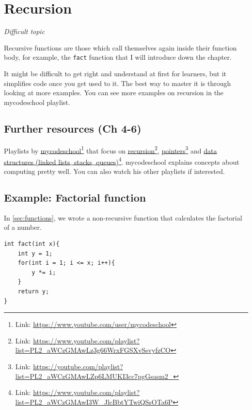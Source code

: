 \chapter{Recursion}

\textit{Difficult topic}


Recursive functions are those which call themselves again inside their function body, for example, the \texttt{fact} function that I will introduce down the chapter.

It might be difficult to get right and understand at first for learners, but it simplifies code once you get used to it. The best way to master it is through looking at more examples. You can see more examples on recursion in the mycodeschool playlist.

\section{Further resources (Ch 4-6)}

Playlists by 
\href{https://www.youtube.com/user/mycodeschool}{mycodeschool}\footnote{Link: \href{https://www.youtube.com/user/mycodeschool}{https://www.youtube.com/user/mycodeschool}}
that focus on 
\href{https://www.youtube.com/playlist?list=PL2\_aWCzGMAwLz3g66WrxFGSXvSsvyfzCO}{recursion}\footnote{Link: \href{https://www.youtube.com/playlist?list=PL2\_aWCzGMAwLz3g66WrxFGSXvSsvyfzCO}{https://www.youtube.com/playlist?list=PL2\_aWCzGMAwLz3g66WrxFGSXvSsvyfzCO}}, 
\href{https://youtube.com/playlist?list=PL2_aWCzGMAwLZp6LMUKI3cc7pgGsasm2_}{pointers}\footnote{Link: \href{https://youtube.com/playlist?list=PL2_aWCzGMAwLZp6LMUKI3cc7pgGsasm2_}{https://youtube.com/playlist?list=PL2\_aWCzGMAwLZp6LMUKI3cc7pgGsasm2\_}} and 
\href{https://www.youtube.com/playlist?list=PL2_aWCzGMAwI3W_JlcBbtYTwiQSsOTa6P}{data structures (linked lists, stacks, queues)}\footnote{Link: \href{https://www.youtube.com/playlist?list=PL2_aWCzGMAwI3W_JlcBbtYTwiQSsOTa6P}{https://www.youtube.com/playlist?list=PL2\_aWCzGMAwI3W\_JlcBbtYTwiQSsOTa6P}}.
mycodeschool explains concepts about computing pretty well. You can also watch his other playlists if interested.

\section{Example: Factorial function}

In \cref{sec:functions}, we wrote a non-recursive function that calculates the factorial of a number.
\begin{lstlisting}
int fact(int x){
    int y = 1;
    for(int i = 1; i <= x; i++){
        y *= i;
    }
    return y;
}
\end{lstlisting}

